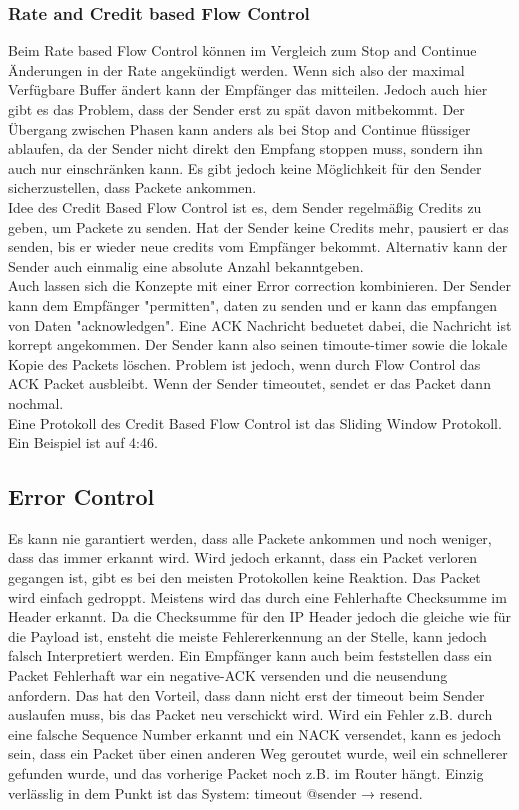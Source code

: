 		\subsubsection{Rate and Credit based Flow Control}
			Beim Rate based Flow Control können im Vergleich zum Stop and Continue Änderungen in der Rate angekündigt werden. Wenn sich also der maximal Verfügbare Buffer ändert kann der Empfänger das mitteilen. Jedoch auch hier gibt es das Problem, dass der Sender erst zu spät davon mitbekommt. Der Übergang zwischen Phasen kann anders als bei Stop and Continue flüssiger ablaufen, da der Sender nicht direkt den Empfang stoppen muss, sondern ihn auch nur einschränken kann. Es gibt jedoch keine Möglichkeit für den Sender sicherzustellen, dass Packete ankommen. \\
			Idee des Credit Based Flow Control ist es, dem Sender regelmäßig Credits zu geben, um Packete zu senden. Hat der Sender keine Credits mehr, pausiert er das senden, bis er wieder neue credits vom Empfänger bekommt. Alternativ kann der Sender auch einmalig eine absolute Anzahl bekanntgeben. \\
			Auch lassen sich die Konzepte mit einer Error correction kombinieren. Der Sender kann dem Empfänger "permitten", daten zu senden und er kann das empfangen von Daten "acknowledgen". Eine ACK Nachricht beduetet dabei, die Nachricht ist korrept angekommen. Der Sender kann also seinen timoute-timer sowie die lokale Kopie des Packets löschen. Problem ist jedoch, wenn durch Flow Control das ACK Packet ausbleibt. Wenn der Sender timeoutet, sendet er das Packet dann nochmal. \\
			Eine Protokoll des Credit Based Flow Control ist das Sliding Window Protokoll. Ein Beispiel ist auf 4:46. 
			
	\subsection{Error Control}
		Es kann nie garantiert werden, dass alle Packete ankommen und noch weniger, dass das immer erkannt wird. Wird jedoch erkannt, dass ein Packet verloren gegangen ist, gibt es bei den meisten Protokollen keine Reaktion. Das Packet wird einfach gedroppt. Meistens wird das durch eine Fehlerhafte Checksumme im Header erkannt. Da die Checksumme für den IP Header jedoch die gleiche wie für die Payload ist, ensteht die meiste Fehlererkennung an der Stelle, kann jedoch falsch Interpretiert werden. Ein Empfänger kann auch beim feststellen dass ein Packet Fehlerhaft war ein negative-ACK versenden und die neusendung anfordern. Das hat den Vorteil, dass dann nicht erst der timeout beim Sender auslaufen muss, bis das Packet neu verschickt wird. Wird ein Fehler z.B. durch eine falsche Sequence Number erkannt und ein NACK versendet, kann es jedoch sein, dass ein Packet über einen anderen Weg geroutet wurde, weil ein schnellerer gefunden wurde, und das vorherige Packet noch z.B. im Router hängt. Einzig verlässlig in dem Punkt ist das System: timeout @sender → resend. 


